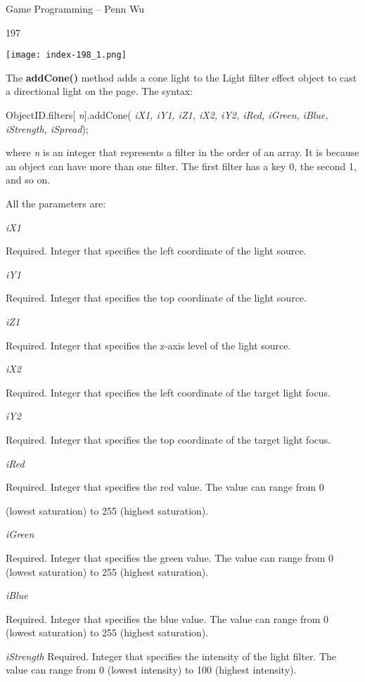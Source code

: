 \documentclass[
]{article}
\begin{document}
Game Programming -- Penn Wu

197

\protect\hypertarget{index_split_011.htmlux5cux23p198}{}{}\texttt{[image: index-198\_1.png]}

The \textbf{addCone()} method adds a cone light to the Light filter
effect object to cast a directional light on the page. The syntax:

ObjectID.filters{[} \emph{n}{]}.addCone( \emph{iX1, iY1, iZ1, iX2, iY2,
iRed, iGreen,} \emph{iBlue, iStrength, iSpread});

where \emph{n} is an integer that represents a filter in the order of an
array. It is because an object can have more than one filter. The first
filter has a key 0, the second 1, and so on.

All the parameters are:

\emph{iX1}

Required. Integer that specifies the left coordinate of the light
source.

\emph{iY1}

Required. Integer that specifies the top coordinate of the light source.

\emph{iZ1}

Required. Integer that specifies the z-axis level of the light source.

\emph{iX2}

Required. Integer that specifies the left coordinate of the target light
focus.

\emph{iY2}

Required. Integer that specifies the top coordinate of the target light
focus.

\emph{iRed}

Required. Integer that specifies the red value. The value can range from
0

(lowest saturation) to 255 (highest saturation).

\emph{iGreen}

Required. Integer that specifies the green value. The value can range
from 0 (lowest saturation) to 255 (highest saturation).

\emph{iBlue}

Required. Integer that specifies the blue value. The value can range
from 0 (lowest saturation) to 255 (highest saturation).

\emph{iStrength} Required. Integer that specifies the intensity of the
light filter. The value can range from 0 (lowest intensity) to 100
(highest intensity).
\end{document}
